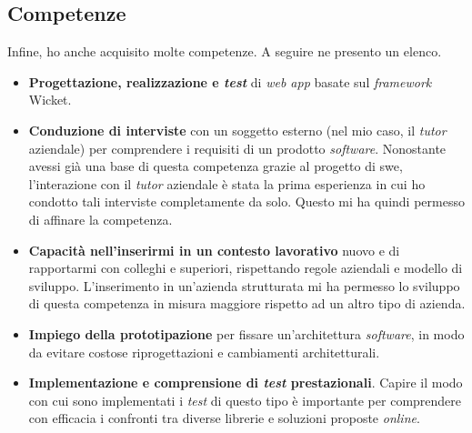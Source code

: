 	\subsection{Competenze}
		Infine, ho anche acquisito molte competenze. A seguire ne presento un elenco.
		\begin{itemize}
			\item \textbf{Progettazione, realizzazione e \textit{test}} di \textit{web app} basate sul \textit{framework} Wicket.
			\item \textbf{Conduzione di interviste} con un soggetto esterno (nel mio caso, il \textit{tutor} aziendale) per comprendere i requisiti di un prodotto \textit{software}. Nonostante avessi già una base di questa competenza grazie al progetto di \gls{swe}, l'interazione con il \textit{tutor} aziendale è stata la prima esperienza in cui ho condotto tali interviste completamente da solo. Questo mi ha quindi permesso di affinare la competenza.
			\item \textbf{Capacità nell'inserirmi in un contesto lavorativo} nuovo e di rapportarmi con colleghi e superiori, rispettando regole aziendali e modello di sviluppo. L'inserimento in un'azienda strutturata mi ha permesso lo sviluppo di questa competenza in misura maggiore rispetto ad un altro tipo di azienda.
			\item \textbf{Impiego della prototipazione} per fissare un'architettura \textit{software}, in modo da evitare costose riprogettazioni e cambiamenti architetturali.
			\item \textbf{Implementazione e comprensione di \textit{test} prestazionali}. Capire il modo con cui sono implementati i \textit{test} di questo tipo è importante per comprendere con efficacia i confronti tra diverse librerie e soluzioni proposte \textit{online}. 
		\end{itemize}	
	
